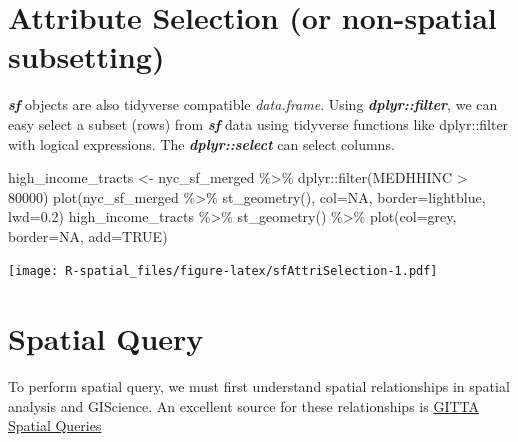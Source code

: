 \documentclass[
  11pt,
]{book}
\newenvironment{Shaded}{\begin{snugshade}}{\end{snugshade}}
\newcommand{\AttributeTok}[1]{\textcolor[rgb]{0.77,0.63,0.00}{#1}}
\newcommand{\ConstantTok}[1]{\textcolor[rgb]{0.00,0.00,0.00}{#1}}
\newcommand{\DecValTok}[1]{\textcolor[rgb]{0.00,0.00,0.81}{#1}}
\newcommand{\FloatTok}[1]{\textcolor[rgb]{0.00,0.00,0.81}{#1}}
\newcommand{\FunctionTok}[1]{\textcolor[rgb]{0.00,0.00,0.00}{#1}}
\newcommand{\NormalTok}[1]{#1}
\newcommand{\OtherTok}[1]{\textcolor[rgb]{0.56,0.35,0.01}{#1}}
\newcommand{\SpecialCharTok}[1]{\textcolor[rgb]{0.00,0.00,0.00}{#1}}
\newcommand{\StringTok}[1]{\textcolor[rgb]{0.31,0.60,0.02}{#1}}
\begin{document}
\hypertarget{attribute-selection-or-non-spatial-subsetting}{%
\section{Attribute Selection (or non-spatial subsetting)}\label{attribute-selection-or-non-spatial-subsetting}}

\textbf{\emph{sf}} objects are also tidyverse compatible \emph{data.frame}. Using \textbf{\emph{dplyr::filter}}, we can easy select a subset (rows) from \textbf{\emph{sf}} data using tidyverse functions like dplyr::filter with logical expressions. The \textbf{\emph{dplyr::select}} can select columns.

\begin{Shaded}
\begin{Highlighting}[]
\NormalTok{high\_income\_tracts }\OtherTok{\textless{}{-}}\NormalTok{ nyc\_sf\_merged }\SpecialCharTok{\%\textgreater{}\%}\NormalTok{ dplyr}\SpecialCharTok{::}\FunctionTok{filter}\NormalTok{(MEDHHINC }\SpecialCharTok{\textgreater{}} \DecValTok{80000}\NormalTok{) }
\FunctionTok{plot}\NormalTok{(nyc\_sf\_merged }\SpecialCharTok{\%\textgreater{}\%} \FunctionTok{st\_geometry}\NormalTok{(), }\AttributeTok{col=}\StringTok{\textquotesingle{}NA\textquotesingle{}}\NormalTok{, }\AttributeTok{border=}\StringTok{\textquotesingle{}lightblue\textquotesingle{}}\NormalTok{, }\AttributeTok{lwd=}\FloatTok{0.2}\NormalTok{)}
\NormalTok{high\_income\_tracts }\SpecialCharTok{\%\textgreater{}\%} \FunctionTok{st\_geometry}\NormalTok{() }\SpecialCharTok{\%\textgreater{}\%} \FunctionTok{plot}\NormalTok{(}\AttributeTok{col=}\StringTok{\textquotesingle{}grey\textquotesingle{}}\NormalTok{, }\AttributeTok{border=}\StringTok{\textquotesingle{}NA\textquotesingle{}}\NormalTok{, }\AttributeTok{add=}\ConstantTok{TRUE}\NormalTok{)}
\end{Highlighting}
\end{Shaded}

\texttt{[image: R-spatial\_files/figure-latex/sfAttriSelection-1.pdf]}

\hypertarget{spatial-query}{%
\section{Spatial Query}\label{spatial-query}}

To perform spatial query, we must first understand spatial relationships in spatial analysis and GIScience. An excellent source for these relationships is \href{http://www.gitta.info/SpatialQueries/en/html/TopoBasedOps_learningObject1.html}{GITTA Spatial Queries}
\end{document}

